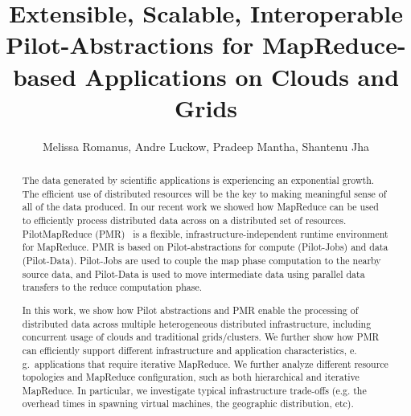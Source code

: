\documentclass[times]{cpeauth}
\newcommand{\pilotmapreduce}{PilotMapReduce\xspace}
\begin{document}

\title{Extensible, Scalable, Interoperable Pilot-Abstractions for MapReduce-based Applications on Clouds and Grids}

\author{Melissa Romanus, Andre Luckow, Pradeep Mantha, Shantenu Jha\corrauth}

\address{Radical Research Group, Rutgers University}


\begin{abstract}

The data generated by scientific applications is experiencing an exponential
growth. The efficient use of distributed resources will be the key to making
meaningful sense of all of the data produced. In our recent work we showed how
MapReduce can be used to efficiently process distributed data across on a
distributed set of resources. \pilotmapreduce 
(PMR)~\cite{Mantha:2012:PEF:2287016.2287020} is a flexible,
infrastructure-independent runtime environment for MapReduce. PMR is based on
Pilot-abstractions for compute (Pilot-Jobs) and data (Pilot-Data). Pilot-Jobs
are used to couple the map phase computation to the nearby source data, and
Pilot-Data is used to move intermediate data using parallel data transfers to
the reduce computation phase.

In this work, we show how Pilot abstractions and PMR enable the processing of
distributed data across multiple heterogeneous distributed infrastructure,
including concurrent usage of clouds and traditional grids/clusters. We 
further show how PMR can efficiently support different infrastructure 
and application characteristics, e.\,g.\ applications that
require iterative MapReduce. We further analyze different resource topologies
and MapReduce configuration, such as both hierarchical and iterative 
MapReduce. In particular, we investigate typical infrastructure trade-offs 
(e.g. the overhead times in spawning virtual machines, the
geographic distribution, etc). 

\end{abstract}


\maketitle
\end{document}
